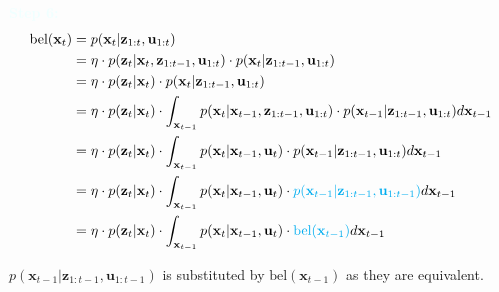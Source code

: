 \documentclass[10pt]{article}
\newcommand{\textbfazure}[1]{\textcolor{azure}{\textbf{#1}}}
\begin{document}
\textbfazure{Step 6:}
\begin{equation}
	\begin{aligned}
		\text{bel}(\mathbf{x}_{t}) & = p( \mathbf{x}_{t}  | \mathbf{z}_{1:t}, \mathbf{u}_{1:t}) \\
		& = \eta \cdot p(\mathbf{z}_{t} |  \mathbf{x}_{t}, \mathbf{z}_{1:t-1}, \mathbf{u}_{1:t}) \cdot p( \mathbf{x}_{t} | \mathbf{z}_{1:t-1}, \mathbf{u}_{1:t}) \\
		& = \eta \cdot p(\mathbf{z}_{t} |  \mathbf{x}_{t}) \cdot p( \mathbf{x}_{t} | \mathbf{z}_{1:t-1}, \mathbf{u}_{1:t}) \\
		& = \eta \cdot p(\mathbf{z}_{t} |  \mathbf{x}_{t}) \cdot \int_{\mathbf{x}_{t-1}} p( \mathbf{x}_{t} | \mathbf{x}_{t-1},\mathbf{z}_{1:t-1}, \mathbf{u}_{1:t}) \cdot p(\mathbf{x}_{t-1} | \mathbf{z}_{1:t-1}, \mathbf{u}_{1:t}) d\mathbf{x}_{t-1}\\
		& = \eta \cdot p(\mathbf{z}_{t} |  \mathbf{x}_{t}) \cdot \int_{\mathbf{x}_{t-1}} p( \mathbf{x}_{t} | \mathbf{x}_{t-1},\mathbf{u}_{t}) \cdot p(\mathbf{x}_{t-1} | \mathbf{z}_{1:t-1}, \mathbf{u}_{1:t}) d\mathbf{x}_{t-1} \\
		& = \eta \cdot p(\mathbf{z}_{t} |  \mathbf{x}_{t}) \cdot \int_{\mathbf{x}_{t-1}} p( \mathbf{x}_{t} | \mathbf{x}_{t-1},\mathbf{u}_{t}) \cdot {\color{Cyan} p(\mathbf{x}_{t-1} | \mathbf{z}_{1:t-1}, \mathbf{u}_{1:t-1})} d\mathbf{x}_{t-1} \\
		& = \eta \cdot p(\mathbf{z}_{t} |  \mathbf{x}_{t}) \cdot \int_{\mathbf{x}_{t-1}} p( \mathbf{x}_{t} | \mathbf{x}_{t-1},\mathbf{u}_{t}) \cdot {\color{Cyan} \text{bel}(\mathbf{x}_{t-1}) } d\mathbf{x}_{t-1} \\
	\end{aligned} 
\end{equation}

$p(\mathbf{x}_{t-1} | \mathbf{z}_{1:t-1}, \mathbf{u}_{1:t-1})$ is substituted by $\text{bel}(\mathbf{x}_{t-1})$ as they are equivalent.
\end{document}
